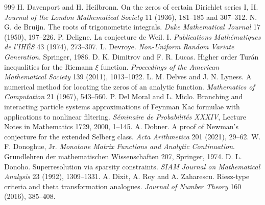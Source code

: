 \begin{thebibliography}{999}
 H. Davenport and H. Heilbronn. On the zeros of certain Dirichlet series I, II. \emph{Journal of the London Mathematical Society} 11 (1936), 181--185 and 307--312.
 N. G. de Bruijn. The roots of trigonometric integrals. \emph{Duke Mathematical Journal} 17 (1950), 197--226.
 P. Deligne. La conjecture de Weil. I. \emph{Publications Math\'ematiques de l'IH\'ES} 43 (1974), 273--307.
 L. Devroye. \emph{Non-Uniform Random Variate Generation}. Springer, 1986.
 D. K. Dimitrov and F. R. Lucas. Higher order Tur\'an inequalities for the Riemann $\xi$ function. \emph{Proceedings of the American Mathematical Society} 139 (2011), 1013--1022.
 L. M. Delves and J. N. Lyness. A numerical method for locating the zeros of an analytic function. \emph{Mathematics of Computation} 21 (1967), 543--560.
 P. Del Moral and L. Miclo. Branching and interacting particle systems approximations of Feynman Kac formulae with applications to nonlinear filtering. \emph{S\'eminaire de Probabilit\'es XXXIV}, Lecture Notes in Mathematics 1729, 2000, 1--145.
 A. Dobner. A proof of Newman's conjecture for the extended Selberg class. \emph{Acta Arithmetica} 201 (2021), 29--62.
 W. F. Donoghue, Jr. \emph{Monotone Matrix Functions and Analytic Continuation}. Grundlehren der mathematischen Wissenschaften 207, Springer, 1974.
 D. L. Donoho. Superresolution via sparsity constraints. \emph{SIAM Journal on Mathematical Analysis} 23 (1992), 1309--1331.
 A. Dixit, A. Roy and A. Zaharescu. Riesz-type criteria and theta transformation analogues. \emph{Journal of Number Theory} 160 (2016), 385--408.


\end{thebibliography}
